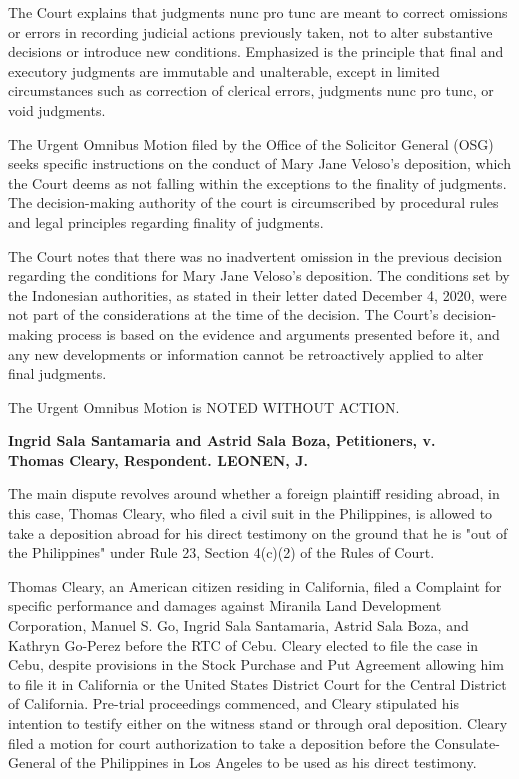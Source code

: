 \documentclass[
12pt,
oneside,
onehalfspacing,
headsepline
]{DigestCollection}
\begin{document}
The Court explains that judgments nunc pro tunc are meant to correct omissions or errors in recording judicial actions previously taken, not to alter substantive decisions or introduce new conditions. Emphasized is the principle that final and executory judgments are immutable and unalterable, except in limited circumstances such as correction of clerical errors, judgments nunc pro tunc, or void judgments.

The Urgent Omnibus Motion filed by the Office of the Solicitor General (OSG) seeks specific instructions on the conduct of Mary Jane Veloso's deposition, which the Court deems as not falling within the exceptions to the finality of judgments. The decision-making authority of the court is circumscribed by procedural rules and legal principles regarding finality of judgments.

The Court notes that there was no inadvertent omission in the previous decision regarding the conditions for Mary Jane Veloso's deposition. The conditions set by the Indonesian authorities, as stated in their letter dated December 4, 2020, were not part of the considerations at the time of the decision. The Court's decision-making process is based on the evidence and arguments presented before it, and any new developments or information cannot be retroactively applied to alter final judgments.

The Urgent Omnibus Motion is NOTED WITHOUT ACTION.

\label{0b114390-0a10-11ef-932c-63c852f65e48}


\noindent\textbf{Ingrid Sala Santamaria and Astrid Sala Boza, Petitioners, v. \\Thomas Cleary, Respondent. LEONEN, J.}\vspace{0.4cm}

The main dispute revolves around whether a foreign plaintiff residing abroad, in this case, Thomas Cleary, who filed a civil suit in the Philippines, is allowed to take a deposition abroad for his direct testimony on the ground that he is "out of the Philippines" under Rule 23, Section 4(c)(2) of the Rules of Court.

Thomas Cleary, an American citizen residing in California, filed a Complaint for specific performance and damages against Miranila Land Development Corporation, Manuel S. Go, Ingrid Sala Santamaria, Astrid Sala Boza, and Kathryn Go-Perez before the RTC of Cebu. Cleary elected to file the case in Cebu, despite provisions in the Stock Purchase and Put Agreement allowing him to file it in California or the United States District Court for the Central District of California. Pre-trial proceedings commenced, and Cleary stipulated his intention to testify either on the witness stand or through oral deposition. Cleary filed a motion for court authorization to take a deposition before the Consulate-General of the Philippines in Los Angeles to be used as his direct testimony.
\end{document}
